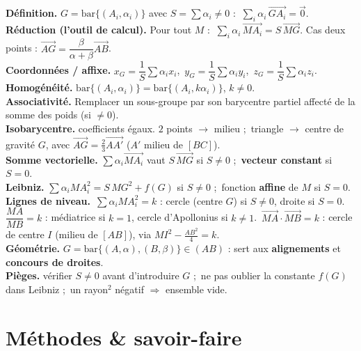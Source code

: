 \begin{synthese}
\textbf{Définition.} $G=\mathrm{bar}\{(A_i,\alpha_i)\}$ avec $S=\sum\alpha_i\neq0$ :
$\ \sum_i\alpha_i\,\overrightarrow{GA_i}=\vec0$.\\[4pt]
\textbf{Réduction (l'outil de calcul).} Pour tout $M$ : $\ \sum_i\alpha_i\,\overrightarrow{MA_i}=S\,\overrightarrow{MG}$.
Cas deux points : $\overrightarrow{AG}=\dfrac{\beta}{\alpha+\beta}\overrightarrow{AB}$.\\[4pt]
\textbf{Coordonnées / affixe.} $x_G=\dfrac1S\sum\alpha_i x_i$,\ $y_G=\dfrac1S\sum\alpha_i y_i$,\ $z_G=\dfrac1S\sum\alpha_i z_i$.\\[4pt]
\textbf{Homogénéité.} $\mathrm{bar}\{(A_i,\alpha_i)\}=\mathrm{bar}\{(A_i,k\alpha_i)\}$, $k\neq0$.\\[4pt]
\textbf{Associativité.} Remplacer un sous-groupe par son barycentre partiel affecté de la somme des poids (si $\neq0$).\\[4pt]
\textbf{Isobarycentre.} coefficients égaux. $2$ points $\to$ milieu ;\ triangle $\to$ centre de gravité $G$, avec $\overrightarrow{AG}=\tfrac23\overrightarrow{AA'}$ ($A'$ milieu de $[BC]$).\\[4pt]
\textbf{Somme vectorielle.} $\sum\alpha_i\overrightarrow{MA_i}$ vaut $S\,\overrightarrow{MG}$ si $S\neq0$ ;\ \textbf{vecteur constant} si $S=0$.\\[4pt]
\textbf{Leibniz.} $\sum\alpha_i MA_i^2=S\,MG^2+f(G)$ si $S\neq0$ ;\ fonction \textbf{affine} de $M$ si $S=0$.\\[4pt]
\textbf{Lignes de niveau.}\ $\sum\alpha_i MA_i^2=k$ : cercle (centre $G$) si $S\neq0$, droite si $S=0$.\
$\dfrac{MA}{MB}=k$ : médiatrice si $k=1$, cercle d'Apollonius si $k\neq1$.\
$\overrightarrow{MA}\cdot\overrightarrow{MB}=k$ : cercle de centre $I$ (milieu de $[AB]$), via $MI^2-\tfrac{AB^2}{4}=k$.\\[4pt]
\textbf{Géométrie.} $G=\mathrm{bar}\{(A,\alpha),(B,\beta)\}\in(AB)$ : sert aux \textbf{alignements} et \textbf{concours de droites}.\\[4pt]
\textbf{Pièges.} vérifier $S\neq0$ avant d'introduire $G$ ;\ ne pas oublier la constante $f(G)$ dans Leibniz ;\ un rayon$^2$ négatif $\Rightarrow$ ensemble vide.
\end{synthese}

\section{Méthodes \& savoir-faire}

